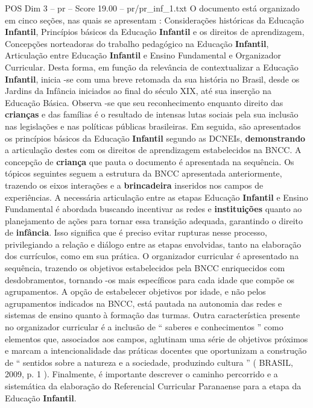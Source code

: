 \begin{textsample}{POS Dim 3 – pr – Score 19.00 – pr/pr\_inf\_1.txt}
O documento está organizado em cinco seções, nas quais se apresentam : Considerações históricas da Educação \textbf{Infantil}, Princípios básicos da Educação \textbf{Infantil} e os direitos de aprendizagem, Concepções norteadoras do trabalho pedagógico na Educação \textbf{Infantil}, Articulação entre Educação \textbf{Infantil} e Ensino Fundamental e Organizador Curricular.
Desta forma, em função da relevância de contextualizar a Educação \textbf{Infantil}, inicia -se com uma breve retomada da sua história no Brasil, desde os Jardins da Infância iniciados ao final do século XIX, até sua inserção na Educação Básica.
Observa -se que seu reconhecimento enquanto direito das \textbf{crianças} e das famílias é o resultado de intensas lutas sociais pela sua inclusão nas legislações e nas políticas públicas brasileiras.
Em seguida, são apresentados os princípios básicos da Educação \textbf{Infantil} segundo as DCNEIs, \textbf{demonstrando} a articulação destes com os direitos de aprendizagem estabelecidos na BNCC.
A concepção de \textbf{criança} que pauta o documento é apresentada na sequência.
Os tópicos seguintes seguem a estrutura da BNCC apresentada anteriormente, trazendo os eixos interações e a \textbf{brincadeira} inseridos nos campos de experiências.
A necessária articulação entre as etapas Educação \textbf{Infantil} e Ensino Fundamental é abordada buscando incentivar as redes e \textbf{instituições} quanto ao planejamento de ações para tornar essa transição adequada, garantindo o direito de \textbf{infância}.
Isso significa que é preciso evitar rupturas nesse processo, privilegiando a relação e diálogo entre as etapas envolvidas, tanto na elaboração dos currículos, como em sua prática.
O organizador curricular é apresentado na sequência, trazendo os objetivos estabelecidos pela BNCC enriquecidos com desdobramentos, tornando -os mais específicos para cada idade que compõe os agrupamentos.
A opção de estabelecer objetivos por idade, e não pelos agrupamentos indicados na BNCC, está pautada na autonomia das redes e sistemas de ensino quanto à formação das turmas.
Outra característica presente no organizador curricular é a inclusão de “ saberes e conhecimentos ” como elementos que, associados aos campos, aglutinam uma série de objetivos próximos e marcam a intencionalidade das práticas docentes que oportunizam a construção de “ sentidos sobre a natureza e a sociedade, produzindo cultura ” ( BRASIL, 2009, p. 1 ).
Finalmente, é importante descrever o caminho percorrido e a sistemática da elaboração do Referencial Curricular Paranaense para a etapa da Educação \textbf{Infantil}.

\end{textsample}
